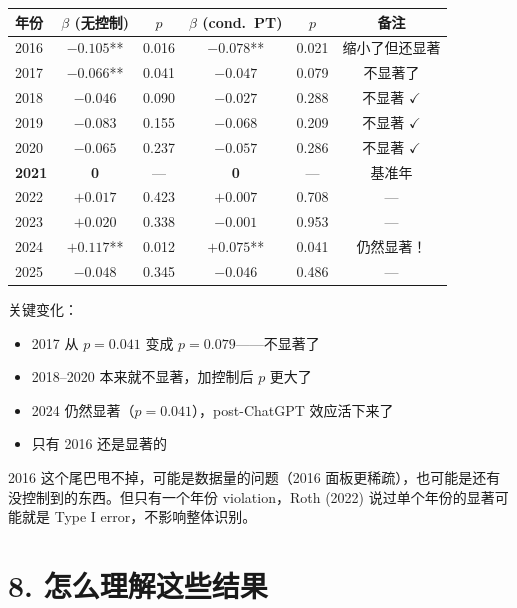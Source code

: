 \documentclass[12pt,a4paper]{article}
\begin{document}
\begin{center}
\small
\begin{tabular}{lccccc}
\toprule
年份 & $\beta$ (无控制) & $p$ & $\beta$ (cond.\ PT) & $p$ & 备注 \\
\midrule
2016 & $-0.105$** & 0.016 & $-0.078$** & 0.021 & 缩小了但还显著 \\
2017 & $-0.066$** & 0.041 & $-0.047$ & 0.079 & 不显著了 \\
2018 & $-0.046$ & 0.090 & $-0.027$ & 0.288 & 不显著 $\checkmark$ \\
2019 & $-0.083$ & 0.155 & $-0.068$ & 0.209 & 不显著 $\checkmark$ \\
2020 & $-0.065$ & 0.237 & $-0.057$ & 0.286 & 不显著 $\checkmark$ \\
\textbf{2021} & \textbf{0} & --- & \textbf{0} & --- & 基准年 \\
2022 & $+0.017$ & 0.423 & $+0.007$ & 0.708 & --- \\
2023 & $+0.020$ & 0.338 & $-0.001$ & 0.953 & --- \\
2024 & $+0.117$** & 0.012 & $+0.075$** & 0.041 & 仍然显著！ \\
2025 & $-0.048$ & 0.345 & $-0.046$ & 0.486 & --- \\
\bottomrule
\end{tabular}
\end{center}

关键变化：
\begin{itemize}
  \item 2017 从 $p=0.041$ 变成 $p=0.079$——不显著了
  \item 2018--2020 本来就不显著，加控制后 $p$ 更大了
  \item 2024 仍然显著（$p=0.041$），post-ChatGPT 效应活下来了
  \item 只有 2016 还是显著的
\end{itemize}

2016 这个尾巴甩不掉，可能是数据量的问题（2016 面板更稀疏），也可能是还有没控制到的东西。但只有一个年份 violation，Roth (2022) 说过单个年份的显著可能就是 Type I error，不影响整体识别。

\bigskip

\section*{8. 怎么理解这些结果}
\end{document}
